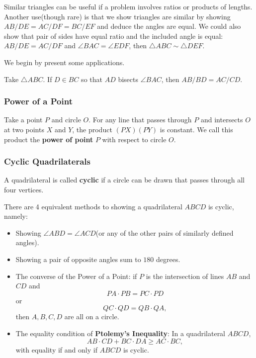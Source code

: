 \documentclass[11pt]{article}
\renewcommand{\>}{\rangle}
\newcommand{\<}{\langle}
\begin{document}
Similar triangles can be useful if a problem involves ratios or products of lengths.  Another use(though rare) is that we show triangles are similar by showing $AB/DE = AC/DF = BC/EF$ and deduce the angles are equal.  We could also show that pair of sides have equal ratio and the included angle is equal: $AB/DE = AC/DF$ and $\angle BAC = \angle EDF$, then $\triangle ABC \sim \triangle DEF$.

We begin by present some applications.
\begin{theorem} Take $\triangle ABC$.  If $D \in BC$ so that $AD$ bisects $\angle BAC$, then $AB/BD = AC/CD$.
\end{theorem}


\subsubsection{Power of a Point}
\begin{theorem} Take a point $P$ and circle $O$.  For any line that passes through $P$ and intersects $O$ at two points $X$ and $Y$, the product $(PX)(PY)$ is constant.  We call this product the \textbf{power of point} $P$ with respect to circle $O$.  
 \end{theorem}

\subsubsection{Cyclic Quadrilaterals}
\begin{definition} A quadrilateral is called \textbf{cyclic} if a circle can be drawn that passes through all four vertices.
\end{definition}
There are 4 equivalent methods to showing a quadrilateral $ABCD$ is cyclic, namely:
\begin{itemize}
\item Showing $\angle ABD = \angle ACD$(or any of the other pairs of similarly defined angles).
\item Showing a pair of opposite angles sum to $180$ degrees.
\item The converse of the Power of a Point: if $P$ is the intersection of lines $AB$ and $CD$ and 
$$PA \cdot PB = PC \cdot PD$$
or 
$$QC \cdot QD = QB \cdot QA,$$
then $A, B, C, D$ are all on a circle.
\item The equality condition of \textbf{Ptolemy's Inequality}: In a quadrilateral $ABCD$, 
$$AB \cdot CD + BC \cdot DA \ge AC \cdot BC,$$
with equality if and only if $ABCD$ is cyclic.
\end{itemize}
\end{document}

